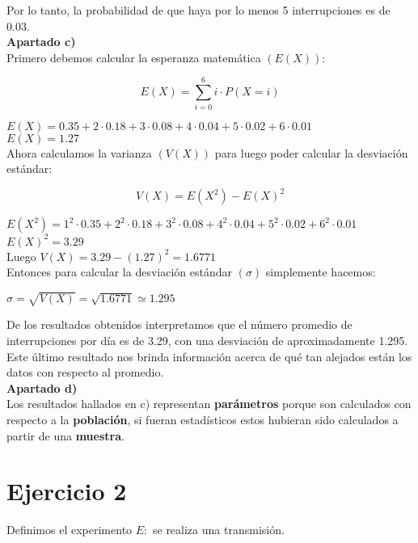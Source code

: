 \documentclass[11pt]{article}
\begin{document}
Por lo tanto, la probabilidad de que haya por lo menos 5 interrupciones es de 0.03. \\

\textbf{Apartado c)} \\

Primero debemos calcular la esperanza matemática $ (E(X)) $:

\[ E(X) = \sum_{i=0}^{6} i \cdot P(X = i) \]

$ E(X) = 0.35 + 2 \cdot 0.18 + 3 \cdot 0.08 + 4 \cdot 0.04 + 5 \cdot 0.02 + 6 \cdot 0.01 $ \\
$ E(X) = 1.27 $ \\

Ahora calculamos la varianza $ (V(X)) $ para luego poder calcular la desviación estándar:

\[  V(X) = E(X^{2}) - E(X)^{2} \]

$ E(X^{2}) = 1^2 \cdot 0.35 + 2^2 \cdot 0.18 + 3^2 \cdot 0.08 + 4^2 \cdot 0.04 + 5^2 \cdot 0.02 + 6^2 \cdot 0.01 $ \\
$ E(X)^2 = 3.29 $ \\

Luego $ V(X) = 3.29 - (1.27)^2 = 1.6771 $ \\

Entonces para calcular la desviación estándar $ (\sigma) $ simplemente hacemos:

\begin{center}
  $ \sigma = \sqrt{V(X)} = \sqrt{1.6771} \simeq 1.295 $
\end{center}

De los resultados obtenidos interpretamos que el número promedio de interrupciones
por día es de 3.29, con una desviación de aproximadamente 1.295. Este último resultado
nos brinda información acerca de qué tan alejados están los datos con respecto al
promedio. \\

\textbf{Apartado d)} \\

Los resultados hallados en c) representan \textbf{parámetros} porque son calculados con respecto
a la \textbf{población}, si fueran estadísticos estos hubieran sido
calculados a partir de una \textbf{muestra}.

\section*{Ejercicio 2}

Definimos el experimento $E:$ se realiza una transmisión. \\
\end{document}
